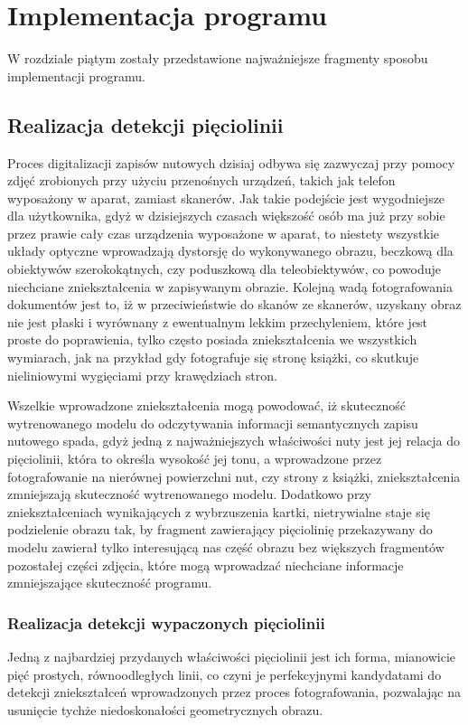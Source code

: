 \chapter{Implementacja programu}
W rozdziale piątym zostały przedstawione najważniejsze fragmenty sposobu implementacji programu. 

\section{Realizacja detekcji pięciolinii}
Proces digitalizacji zapisów nutowych dzisiaj odbywa się zazwyczaj przy pomocy zdjęć zrobionych przy użyciu przenośnych urządzeń, takich jak telefon wyposażony w aparat, zamiast skanerów. Jak takie podejście jest wygodniejsze dla użytkownika, gdyż w dzisiejszych czasach większość osób ma już przy sobie przez prawie cały czas urządzenia wyposażone w aparat, to niestety wszystkie układy optyczne wprowadzają dystorsję do wykonywanego obrazu, beczkową dla obiektywów szerokokątnych, czy poduszkową dla teleobiektywów, co powoduje niechciane zniekształcenia w zapisywanym obrazie. Kolejną wadą fotografowania dokumentów jest to, iż w przeciwieństwie do skanów ze skanerów, uzyskany obraz nie jest płaski i wyrównany z ewentualnym lekkim przechyleniem, które jest proste do poprawienia, tylko często posiada zniekształcenia we wszystkich wymiarach, jak na przykład gdy fotografuje się stronę książki, co skutkuje nieliniowymi wygięciami przy krawędziach stron. 

Wszelkie wprowadzone zniekształcenia mogą powodować, iż skuteczność wytrenowanego modelu do odczytywania informacji semantycznych zapisu nutowego spada, gdyż jedną z najważniejszych właściwości nuty jest jej relacja do pięciolinii, która to określa wysokość jej tonu, a wprowadzone przez fotografowanie na nierównej powierzchni nut, czy strony z książki, zniekształcenia zmniejszają skuteczność wytrenowanego modelu. Dodatkowo przy zniekształceniach wynikających z wybrzuszenia kartki, nietrywialne staje się podzielenie obrazu tak, by fragment zawierający pięciolinię przekazywany do modelu zawierał tylko interesującą nas część obrazu bez większych fragmentów pozostałej części zdjęcia, które mogą wprowadzać niechciane informacje zmniejszające skuteczność programu.



\subsection{Realizacja detekcji wypaczonych pięciolinii}
Jedną z najbardziej przydanych właściwości pięciolinii jest ich forma, mianowicie pięć prostych, równoodległych linii, co czyni je perfekcyjnymi kandydatami do detekcji zniekształceń wprowadzonych przez proces fotografowania, pozwalając na usunięcie tychże niedoskonałości geometrycznych obrazu. 

